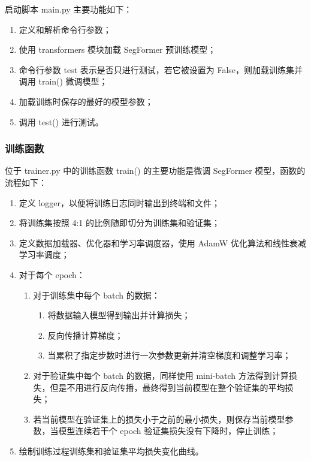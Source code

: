 \documentclass[hyperref,a4paper,UTF8]{ctexart}
\begin{document}
启动脚本 main.py 主要功能如下：

\begin{enumerate}[itemsep=2pt,topsep=0pt,parsep=0pt]
    \item 定义和解析命令行参数；
    \item 使用 transformers 模块加载 SegFormer 预训练模型；
    \item 命令行参数 test 表示是否只进行测试，若它被设置为 False，则加载训练集并调用 train() 微调模型；
    \item 加载训练时保存的最好的模型参数；
    \item 调用 test() 进行测试。
\end{enumerate}

\subsubsection{训练函数}

位于 trainer.py 中的训练函数 train() 的主要功能是微调 SegFormer 模型，函数的流程如下：

\begin{enumerate}[itemsep=2pt,topsep=0pt,parsep=0pt]
    \item 定义 logger，以便将训练日志同时输出到终端和文件；
    \item 将训练集按照 4:1 的比例随即切分为训练集和验证集；
    \item 定义数据加载器、优化器和学习率调度器，使用 AdamW 优化算法和线性衰减学习率调度；
    \item 对于每个 epoch：
    \begin{enumerate}[itemsep=2pt,topsep=0pt,parsep=0pt]
        \item 对于训练集中每个 batch 的数据：
        \begin{enumerate}[itemsep=2pt,topsep=0pt,parsep=0pt]
            \item 将数据输入模型得到输出并计算损失；
            \item 反向传播计算梯度；
            \item 当累积了指定步数时进行一次参数更新并清空梯度和调整学习率；
        \end{enumerate}
        \item 对于验证集中每个 batch 的数据，同样使用 mini-batch 方法得到计算损失，但是不用进行反向传播，最终得到当前模型在整个验证集的平均损失；
        \item 若当前模型在验证集上的损失小于之前的最小损失，则保存当前模型参数，当模型连续若干个 epoch 验证集损失没有下降时，停止训练；
    \end{enumerate}
    \item 绘制训练过程训练集和验证集平均损失变化曲线。
\end{enumerate}
\end{document}
